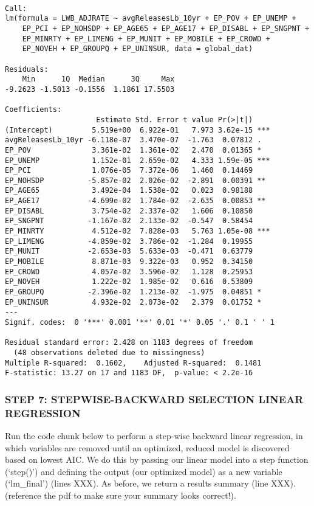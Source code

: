 \documentclass[
  12pt,
]{article}
\begin{document}
\begin{verbatim}

Call:
lm(formula = LWB_ADJRATE ~ avgReleasesLb_10yr + EP_POV + EP_UNEMP + 
    EP_PCI + EP_NOHSDP + EP_AGE65 + EP_AGE17 + EP_DISABL + EP_SNGPNT + 
    EP_MINRTY + EP_LIMENG + EP_MUNIT + EP_MOBILE + EP_CROWD + 
    EP_NOVEH + EP_GROUPQ + EP_UNINSUR, data = global_dat)

Residuals:
    Min      1Q  Median      3Q     Max 
-9.2623 -1.5013 -0.1556  1.1861 17.5503 

Coefficients:
                     Estimate Std. Error t value Pr(>|t|)    
(Intercept)         5.519e+00  6.922e-01   7.973 3.62e-15 ***
avgReleasesLb_10yr -6.118e-07  3.470e-07  -1.763  0.07812 .  
EP_POV              3.361e-02  1.361e-02   2.470  0.01365 *  
EP_UNEMP            1.152e-01  2.659e-02   4.333 1.59e-05 ***
EP_PCI              1.076e-05  7.372e-06   1.460  0.14469    
EP_NOHSDP          -5.857e-02  2.026e-02  -2.891  0.00391 ** 
EP_AGE65            3.492e-04  1.538e-02   0.023  0.98188    
EP_AGE17           -4.699e-02  1.784e-02  -2.635  0.00853 ** 
EP_DISABL           3.754e-02  2.337e-02   1.606  0.10850    
EP_SNGPNT          -1.167e-02  2.133e-02  -0.547  0.58454    
EP_MINRTY           4.512e-02  7.828e-03   5.763 1.05e-08 ***
EP_LIMENG          -4.859e-02  3.786e-02  -1.284  0.19955    
EP_MUNIT           -2.653e-03  5.633e-03  -0.471  0.63779    
EP_MOBILE           8.871e-03  9.322e-03   0.952  0.34150    
EP_CROWD            4.057e-02  3.596e-02   1.128  0.25953    
EP_NOVEH            1.222e-02  1.985e-02   0.616  0.53809    
EP_GROUPQ          -2.396e-02  1.213e-02  -1.975  0.04851 *  
EP_UNINSUR          4.932e-02  2.073e-02   2.379  0.01752 *  
---
Signif. codes:  0 '***' 0.001 '**' 0.01 '*' 0.05 '.' 0.1 ' ' 1

Residual standard error: 2.428 on 1183 degrees of freedom
  (48 observations deleted due to missingness)
Multiple R-squared:  0.1602,    Adjusted R-squared:  0.1481 
F-statistic: 13.27 on 17 and 1183 DF,  p-value: < 2.2e-16
\end{verbatim}

\hypertarget{step-7-stepwise-backward-selection-linear-regression}{%
\subsubsection{STEP 7: STEPWISE-BACKWARD SELECTION LINEAR
REGRESSION}\label{step-7-stepwise-backward-selection-linear-regression}}

Run the code chunk below to perform a step-wise backward linear
regression, in which variables are removed until an optimized, reduced
model is discovered based on lowest AIC. We do this by passing our
linear model into a step function (`step()') and defining the output
(our optimized model) as a new variable (`lm\_final') (lines XXX). As
before, we return a results summary (line XXX).(reference the pdf to
make sure your summary looks correct!).
\end{document}
